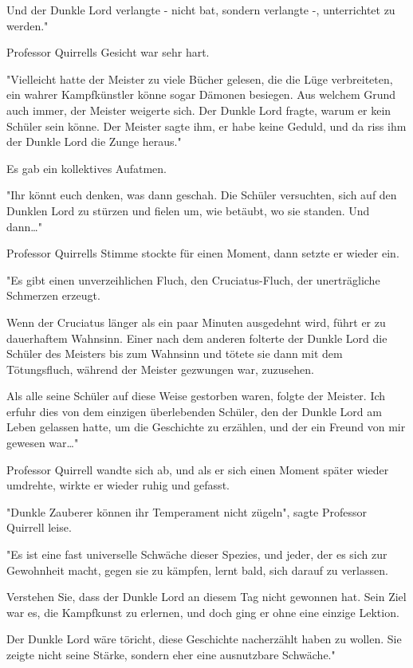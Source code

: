 {Und der Dunkle Lord verlangte - nicht bat, sondern verlangte -, unterrichtet zu werden."

Professor Quirrells Gesicht war sehr hart.

"Vielleicht hatte der Meister zu viele Bücher gelesen, die die Lüge verbreiteten, ein wahrer Kampfkünstler könne sogar Dämonen besiegen. Aus welchem Grund auch immer, der Meister weigerte sich. Der Dunkle Lord fragte, warum er kein Schüler sein könne. Der Meister sagte ihm, er habe keine Geduld, und da riss ihm der Dunkle Lord die Zunge heraus."

Es gab ein kollektives Aufatmen.

"Ihr könnt euch denken, was dann geschah. Die Schüler versuchten, sich auf den Dunklen Lord zu stürzen und fielen um, wie betäubt, wo sie standen. Und dann…"

Professor Quirrells Stimme stockte für einen Moment, dann setzte er wieder ein.

"Es gibt einen unverzeihlichen Fluch, den Cruciatus-Fluch, der unerträgliche Schmerzen erzeugt.

Wenn der Cruciatus länger als ein paar Minuten ausgedehnt wird, führt er zu dauerhaftem Wahnsinn. Einer nach dem anderen folterte der Dunkle Lord die Schüler des Meisters bis zum Wahnsinn und tötete sie dann mit dem Tötungsfluch, während der Meister gezwungen war, zuzusehen.

Als alle seine Schüler auf diese Weise gestorben waren, folgte der Meister. Ich erfuhr dies von dem einzigen überlebenden Schüler, den der Dunkle Lord am Leben gelassen hatte, um die Geschichte zu erzählen, und der ein Freund von mir gewesen war…"

Professor Quirrell wandte sich ab, und als er sich einen Moment später wieder umdrehte, wirkte er wieder ruhig und gefasst.

"Dunkle Zauberer können ihr Temperament nicht zügeln", sagte Professor Quirrell leise.

"Es ist eine fast universelle Schwäche dieser Spezies, und jeder, der es sich zur Gewohnheit macht, gegen sie zu kämpfen, lernt bald, sich darauf zu verlassen.

Verstehen Sie, dass der Dunkle Lord an diesem Tag nicht gewonnen hat. Sein Ziel war es, die Kampfkunst zu erlernen, und doch ging er ohne eine einzige Lektion.

Der Dunkle Lord wäre töricht, diese Geschichte nacherzählt haben zu wollen. Sie zeigte nicht seine Stärke, sondern eher eine ausnutzbare Schwäche."

}
